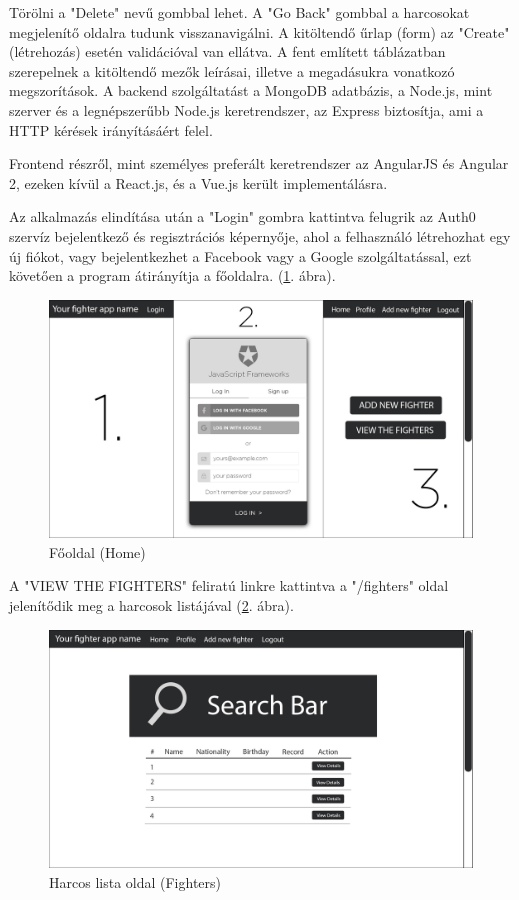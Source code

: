 Törölni a "Delete" nevű gombbal lehet. A "Go Back" gombbal a harcosokat megjelenítő oldalra tudunk visszanavigálni. A kitöltendő űrlap (form) az "Create" (létrehozás) esetén validációval van ellátva. A fent említett táblázatban szerepelnek a kitöltendő mezők leírásai, illetve a megadásukra vonatkozó megszorítások. A backend szolgáltatást a MongoDB adatbázis, a Node.js, mint szerver és a legnépszerűbb Node.js keretrendszer, az Express biztosítja, ami a HTTP kérések irányításáért felel.

Frontend részről, mint személyes preferált keretrendszer az AngularJS és Angular 2, ezeken kívül a React.js, és a Vue.js került implementálásra.

Az alkalmazás elindítása után a "Login" gombra kattintva felugrik az Auth0 szervíz bejelentkező és regisztrációs képernyője, ahol a felhasználó létrehozhat egy új fiókot, vagy bejelentkezhet a Facebook vagy a Google szolgáltatással, ezt követően a program átirányítja a főoldalra. (\ref{fig:home}. ábra).

\begin{figure}[htb]
\centering
\includegraphics[scale=0.7]{kepek/login_auth0_home.jpg}
\caption{Főoldal (Home)}
\label{fig:home}
\end{figure}

A "VIEW THE FIGHTERS" feliratú linkre kattintva a "/fighters" oldal jelenítődik meg a harcosok listájával (\ref{fig:search_bar}. ábra).

\begin{figure}[htb]
\centering
\includegraphics[scale=0.7]{kepek/search_bar.jpg}
\caption{Harcos lista oldal (Fighters)}
\label{fig:search_bar}
\end{figure}

